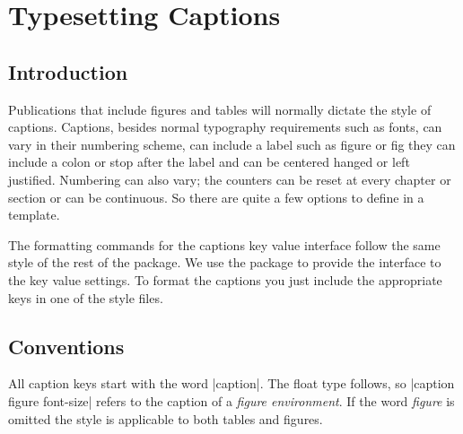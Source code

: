\chapter{Typesetting Captions}
\section{Introduction}

Publications that include figures and tables will normally dictate
the style of captions. Captions, besides normal typography 
requirements such as fonts, can vary in their numbering scheme, can
include a label such as figure or fig they can include a colon or stop
after the label and can be centered hanged or left justified. 
Numbering can also vary; the counters can be reset at every chapter or section or can be continuous. So
there are quite a few options to define in a template.

The formatting commands for the captions key value interface follow the same style of the rest of the package. We use the  package to provide the interface to the key value settings. To format the captions you just include the appropriate keys in one of the style
files.


\section{Conventions}

All caption keys start with the word |caption|. The float type follows, so |caption figure font-size| refers to the caption of a \textit{figure environment}. If the word \textit{figure} is omitted the style is applicable to both tables and figures. 

